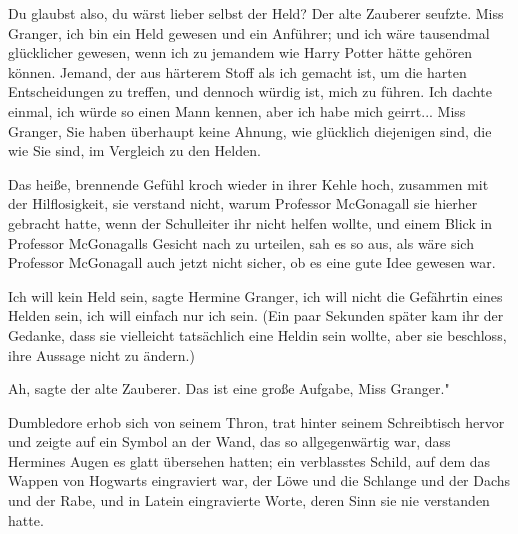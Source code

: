 \glqq{}Du glaubst also, du wärst lieber selbst der Held?\grqq{} Der alte Zauberer
seufzte. \glqq{}Miss Granger, ich bin ein Held gewesen und ein Anführer; und ich
wäre tausendmal glücklicher gewesen, wenn ich zu jemandem wie Harry Potter hätte
gehören können. Jemand, der aus härterem Stoff als ich gemacht ist, um die
harten Entscheidungen zu treffen, und dennoch würdig ist, mich zu führen. Ich
dachte einmal, ich würde so einen Mann kennen, aber ich habe mich geirrt... Miss
Granger, Sie haben überhaupt keine Ahnung, wie glücklich diejenigen sind, die
wie Sie sind, im Vergleich zu den Helden.\grqq{}

Das heiße, brennende Gefühl kroch wieder in ihrer Kehle hoch, zusammen mit der
Hilflosigkeit, sie verstand nicht, warum Professor McGonagall sie hierher
gebracht hatte, wenn der Schulleiter ihr nicht helfen wollte, und einem Blick in
Professor McGonagalls Gesicht nach zu urteilen, sah es so aus, als wäre sich
Professor McGonagall auch jetzt nicht sicher, ob es eine gute Idee gewesen war.

\glqq{}Ich will kein Held sein\grqq{}, sagte Hermine Granger, \glqq{}ich will
nicht die Gefährtin eines Helden sein, ich will einfach nur ich sein.\grqq{}
(Ein paar Sekunden später kam ihr der Gedanke, dass sie vielleicht tatsächlich
eine Heldin sein wollte, aber sie beschloss, ihre Aussage nicht zu ändern.)

\glqq{}Ah\grqq{}, sagte der alte Zauberer. \glqq{}Das ist eine große Aufgabe, Miss
Granger."

Dumbledore erhob sich von seinem Thron, trat hinter seinem Schreibtisch hervor
und zeigte auf ein Symbol an der Wand, das so allgegenwärtig war, dass Hermines
Augen es glatt übersehen hatten; ein verblasstes Schild, auf dem das Wappen von
Hogwarts eingraviert war, der Löwe und die Schlange und der Dachs und der Rabe,
und in Latein eingravierte Worte, deren Sinn sie nie verstanden hatte.

